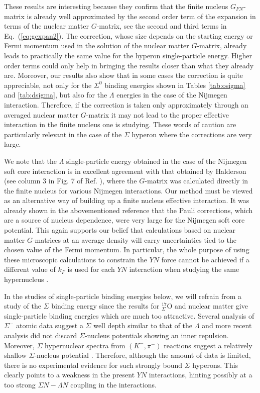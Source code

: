 These results  are interesting because they confirm that
the finite nucleus $G_{FN}$-matrix is already well 
approximated by the second order term 
of the expansion in terms of the nuclear matter $G$-matrix, see
the second and third terms in Eq.\ (\ref{eq:gexpan2}).
The correction, whose size depends on the starting energy or Fermi
momentum used in the solution of the nuclear matter $G$-matrix, already
leads to practically the same value for the hyperon single-particle energy.
Higher order terms could only help in bringing the results closer than
what they already are.
Moreover, our results also show that in some cases the correction is
quite
appreciable, not only for the $\Sigma^0$ binding energies shown in
Tables \ref{tab:osigma} and \ref{tab:dsigma}, but also for the
$\Lambda$ energies in
the case of the Nijmegen interaction. Therefore, if the correction is
taken only approximately through an averaged nuclear matter $G$-matrix 
\cite{yama85,yama90,yama92,yama94} it may not lead to the proper
effective interaction in the finite nucleus one is studying. These
words of caution are particularly relevant in the case of the $\Sigma$
hyperon where the corrections are very large.

We note that the $\Lambda$ single-particle energy obtained in the case of the
Nijmegen soft core interaction is in excellent agreement with that
obtained by Halderson (see column 3 in Fig. 7 of Ref.
\cite{hald93}), where the $G$-matrix
was calculated directly in the finite nucleus for various Nijmegen
interactions. 
Our method must be viewed as an alternative
way of building up a finite nucleus
effective interaction. 
It was already
shown in the abovementioned reference 
that the Pauli corrections, which are a source of nucleus
dependence, were very large for the Nijmegen soft core potential. This
again supports our belief that calculations based on nuclear matter
$G$-matrices at an average density will carry uncertainties tied to
the chosen value of the Fermi momentum. In particular, the whole
purpose of using these microscopic calculations to constrain the
$YN$ force cannot be achieved if a different value of
$k_F$ is used for each $YN$ interaction when studying the same 
hypernucleus \cite{yama92}.

In the studies of single-particle binding energies below,
we will refrain from a study of the $\Sigma$ binding energy
since the results for $^{17}_{\Sigma}$O and nuclear 
matter give single-particle binding energies which are much too
attractive. Several analysis of $\Sigma^{-}$ atomic data \cite{sig1,sig2}
suggest a $\Sigma$ well depth similar to that of the $\Lambda$
\cite{batty79,batty81} and more recent analysis \cite{batty94,mares95} did
not discard $\Sigma$-nucleus potentials showing an inner repulsion.
Moreover, $\Sigma$ hypernuclear spectra from $(K^-,\pi^-)$ reactions
suggest a relatively shallow $\Sigma$-nucleus potential \cite{dover89}.
Therefore, although the amount of data is limited, there is no 
experimental evidence
for such strongly bound $\Sigma$ hyperons. 
This clearly points to a weakness in the present $YN$ interactions,
hinting possibly at a too strong $\Sigma N - \Lambda N$ coupling
in the interactions. 



